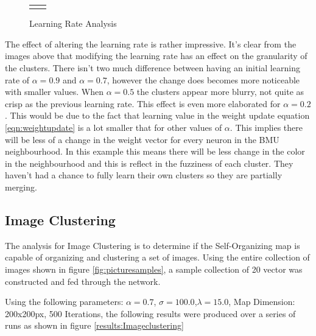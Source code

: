\documentclass{IEEEtran}
\begin{document}
\begin{figure}[!htbp]
\begin{tabular}{cc}
\begin{minipage}{100pt}
\caption{$\alpha=0.20$}
\label{fig:4}
\end{minipage}
\end{tabular}
\caption{Learning Rate Analysis}
\end{figure} 

The effect of altering the learning rate is rather impressive. It's clear from the images above that modifying the learning rate has an effect on the granularity of the clusters. There isn't two much difference between having an initial learning rate of $\alpha=0.9$ and $\alpha=0.7$, however the change does becomes more noticeable with smaller values. When $\alpha=0.5$ the clusters appear more blurry, not quite as crisp as the previous learning rate. This effect is even more elaborated for $\alpha=0.2$. 
	This would be due to the fact that learning value in the weight update equation \ref{eqn:weightupdate} is a lot smaller that for other values of $\alpha$. This implies there will be less of a change in the weight vector for every neuron in the BMU neighbourhood. In this example this means there will be less change in the color in the neighbourhood and this is reflect in the fuzziness of each cluster. They haven't had a chance to fully learn their own clusters so they are partially merging. 

\subsection{Image Clustering}
The analysis for Image Clustering is to determine if the Self-Organizing map is capable of organizing and clustering a set of images. Using the entire collection of images shown in figure \ref{fig:picturesamples}, a sample collection of 20 vector was constructed and fed through the network. 

Using the following parameters: $\alpha=0.7$, $\sigma=100.0$,$\lambda=15.0$, Map Dimension: 200x200px, 500 Iterations, the following results were produced over a series of runs as shown in figure \ref{results:Imageclustering}
\end{document}
